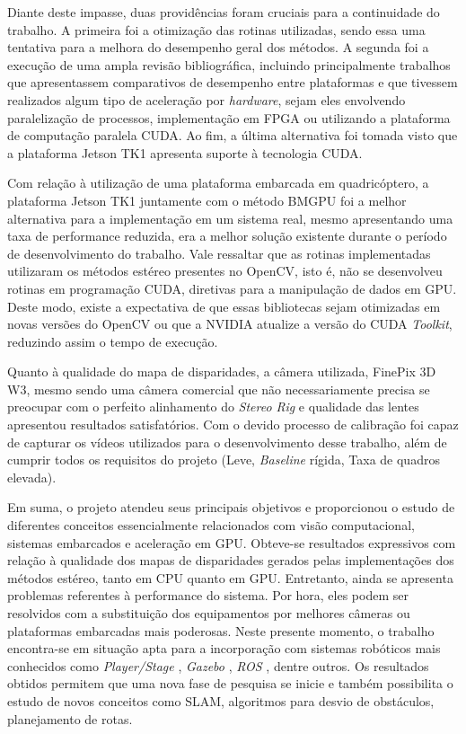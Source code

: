 Diante deste impasse, duas providências foram cruciais para a continuidade do trabalho. A primeira foi a otimização das rotinas utilizadas, sendo essa uma tentativa para a melhora do desempenho geral dos métodos. A segunda foi a execução de uma ampla revisão bibliográfica, incluindo principalmente trabalhos que apresentassem comparativos de desempenho entre plataformas e que tivessem realizados algum tipo de aceleração por \textit{hardware}, sejam eles envolvendo paralelização de processos, implementação em FPGA ou utilizando a plataforma de computação paralela CUDA. Ao fim, a última alternativa foi tomada visto que a plataforma Jetson TK1 apresenta suporte à tecnologia CUDA.

Com relação à utilização de uma plataforma embarcada em quadricóptero, a plataforma Jetson TK1 juntamente com o método BMGPU foi a melhor alternativa para a implementação em um sistema real, mesmo apresentando uma taxa de performance reduzida, era a melhor solução existente durante o período de desenvolvimento do trabalho. Vale ressaltar que as rotinas implementadas utilizaram os métodos estéreo presentes no OpenCV, isto é, não se desenvolveu rotinas em programação CUDA, diretivas para a manipulação de dados em GPU. Deste modo, existe a expectativa de que essas bibliotecas sejam otimizadas em novas versões do OpenCV ou que a NVIDIA atualize a versão do CUDA \textit{Toolkit}, reduzindo assim o tempo de execução.

Quanto à qualidade do mapa de disparidades, a câmera utilizada, FinePix 3D W3, mesmo sendo uma câmera comercial que não necessariamente precisa se preocupar com o perfeito alinhamento do \textit{Stereo Rig} e qualidade das lentes apresentou resultados satisfatórios. Com o devido processo de calibração foi capaz de capturar os vídeos utilizados para o desenvolvimento desse trabalho, além de cumprir todos os requisitos do projeto (Leve, \textit{Baseline} rígida, Taxa de quadros elevada).

Em suma, o projeto atendeu seus principais objetivos e proporcionou o estudo de diferentes conceitos essencialmente relacionados com visão computacional, sistemas embarcados e aceleração em GPU. Obteve-se resultados expressivos com relação à qualidade dos mapas de disparidades gerados pelas implementações dos métodos estéreo, tanto em CPU quanto em GPU. Entretanto, ainda se apresenta problemas referentes à performance do sistema. Por hora, eles podem ser resolvidos com a substituição dos equipamentos por melhores câmeras ou plataformas embarcadas mais poderosas. Neste presente momento, o trabalho encontra-se em situação apta para a incorporação com sistemas robóticos mais conhecidos como \textit{Player/Stage} \cite{Gerkey2010}, \textit{Gazebo} \cite{Gazebo}, \textit{ROS} \cite{ROS}, dentre outros. Os resultados obtidos permitem que uma nova fase de pesquisa se inicie e também possibilita o estudo de novos conceitos como SLAM, algoritmos para desvio de obstáculos, planejamento de rotas.

